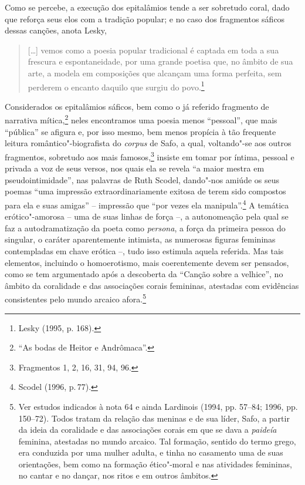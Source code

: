 Como se percebe, a execução dos epitalâmios tende a ser sobretudo coral, dado
que reforça seus elos com a tradição popular; e no caso dos fragmentos sáficos
dessas canções, anota Lesky, 

\begin{quote}
\mbox[\ldots{}] vemos como a poesia popular
tradicional é captada em toda a sua frescura e espontaneidade, por uma grande
poetisa que, no âmbito de sua arte, a modela em composições que alcançam uma
forma perfeita, sem perderem o encanto daquilo que surgiu do povo.\footnote{ Lesky (1995, p. 168).}
\end{quote}

Considerados os epitalâmios sáficos, bem como o já referido fragmento de
narrativa mítica,\footnote{``As bodas de Heitor e Andrômaca''.} neles
encontramos uma poesia menos “pessoal”, que mais ``pública'' se afigura e, por isso mesmo, bem menos propícia à tão frequente leitura romântico"-biografista do \textit{corpus} de
Safo, a qual, voltando"-se aos outros fragmentos, sobretudo aos mais famosos,\footnote{Fragmentos 1, 2, 16, 31, 94, 96.} insiste em tomar por íntima, pessoal e privada a voz de seus versos, nos quais ela se revela “a maior mestra em pseudointimidade”, nas palavras de Ruth Scodel, dando"-nos amiúde os seus poemas “uma impressão extraordinariamente exitosa de terem sido compostos para ela e suas amigas” -- impressão que “por vezes ela manipula”.\footnote{Scodel (1996, p.\,77).}
A temática
erótico"-amorosa -- uma de suas linhas de força --, a autonomeação
pela qual se faz a autodramatização da poeta como \textit{persona}, a força da primeira pessoa do singular, o caráter
aparentemente intimista, as numerosas figuras
femininas contempladas em chave erótica --, tudo isso estimula aquela referida.
Mas tais elementos, incluindo o homoerotismo, mais coerentemente devem ser pensados, como se tem argumentado após a descoberta da ``Canção sobre a velhice'', no âmbito da coralidade e das associações corais femininas, atestadas com evidências consistentes pelo mundo arcaico afora.\footnote{Ver estudos indicados à nota 64 e ainda Lardinois (1994, pp. 57--84; 1996, pp. 150--72). Todos tratam da relação das meninas e de sua líder, Safo, a partir da ideia da coralidade e das associações corais em que se dava a \textit{paideía} feminina, atestadas no mundo arcaico. Tal formação, sentido do termo grego, era conduzida por uma mulher adulta, e tinha no casamento uma de suas orientações, bem como na formação ético"-moral e nas atividades femininas, no cantar e no dançar, nos ritos e em outros âmbitos.} 

